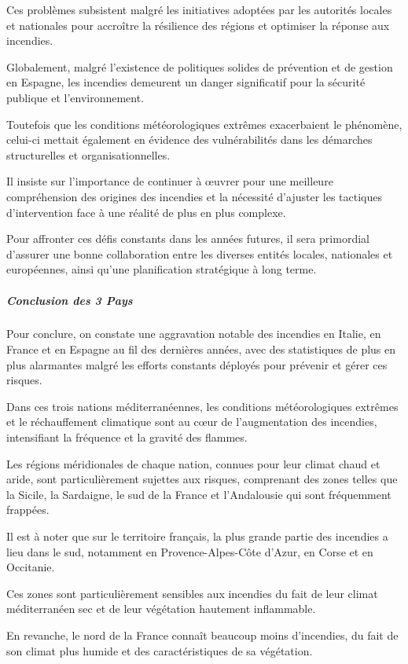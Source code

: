 \documentclass[
]{article}
\begin{document}
Ces problèmes subsistent malgré les initiatives adoptées par les
autorités locales et nationales pour accroître la résilience des régions
et optimiser la réponse aux incendies.

Globalement, malgré l'existence de politiques solides de prévention et
de gestion en Espagne, les incendies demeurent un danger significatif
pour la sécurité publique et l'environnement.

Toutefois que les conditions météorologiques extrêmes exacerbaient le
phénomène, celui-ci mettait également en évidence des vulnérabilités
dans les démarches structurelles et organisationnelles.

Il insiste sur l'importance de continuer à œuvrer pour une meilleure
compréhension des origines des incendies et la nécessité d'ajuster les
tactiques d'intervention face à une réalité de plus en plus complexe.

Pour affronter ces défis constants dans les années futures, il sera
primordial d'assurer une bonne collaboration entre les diverses entités
locales, nationales et européennes, ainsi qu'une planification
stratégique à long terme.

\subparagraph{Conclusion des 3 Pays}\label{conclusion-des-3-pays}

Pour conclure, on constate une aggravation notable des incendies en
Italie, en France et en Espagne au fil des dernières années, avec des
statistiques de plus en plus alarmantes malgré les efforts constants
déployés pour prévenir et gérer ces risques.

Dans ces trois nations méditerranéennes, les conditions météorologiques
extrêmes et le réchauffement climatique sont au cœur de l'augmentation
des incendies, intensifiant la fréquence et la gravité des flammes.

Les régions méridionales de chaque nation, connues pour leur climat
chaud et aride, sont particulièrement sujettes aux risques, comprenant
des zones telles que la Sicile, la Sardaigne, le sud de la France et
l'Andalousie qui sont fréquemment frappées.

Il est à noter que sur le territoire français, la plus grande partie des
incendies a lieu dans le sud, notamment en Provence-Alpes-Côte d'Azur,
en Corse et en Occitanie.

Ces zones sont particulièrement sensibles aux incendies du fait de leur
climat méditerranéen sec et de leur végétation hautement inflammable.

En revanche, le nord de la France connaît beaucoup moins d'incendies, du
fait de son climat plus humide et des caractéristiques de sa végétation.
\end{document}
